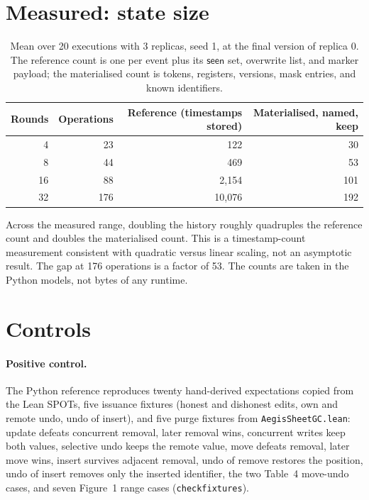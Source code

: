 \documentclass[11pt]{article}
\newcommand{\lean}[1]{\texttt{\def\_{\textunderscore\allowbreak}#1}}
\newcommand{\seen}{\mathsf{seen}}
\begin{document}
\section{Measured: state size}

\begin{table}[h]
\centering\small
\begin{tabular}{@{}rrrr@{}}
\toprule
Rounds & Operations & Reference (timestamps stored) & Materialised, named, keep \\
\midrule
4 & 23 & 122 & 30 \\
8 & 44 & 469 & 53 \\
16 & 88 & 2{,}154 & 101 \\
32 & 176 & 10{,}076 & 192 \\
\bottomrule
\end{tabular}
\caption{Mean over 20 executions with 3 replicas, seed 1, at the final
version of replica 0. The reference count is one per event plus its
$\seen$ set, overwrite list, and marker payload; the materialised count is
tokens, registers, versions, mask entries, and known identifiers.}
\label{tab:growth}
\end{table}

Across the measured range, doubling the history roughly quadruples the
reference count and doubles the materialised count. This is a
timestamp-count measurement consistent with quadratic versus linear scaling,
not an asymptotic result. The gap at 176 operations is a factor of 53. The
counts are taken in the Python models, not bytes of any runtime.

\section{Controls}
\label{sec:controls}

\paragraph{Positive control.} The Python reference reproduces twenty
hand-derived expectations copied from the Lean SPOTs, five issuance
fixtures (honest and dishonest edits, own and remote undo, undo of insert),
and five purge fixtures from \lean{AegisSheetGC.lean}: update defeats
concurrent removal, later removal wins, concurrent writes keep both values,
selective undo keeps the remote value, move defeats removal, later move wins,
insert survives adjacent removal, undo of remove restores the position, undo
of insert removes only the inserted identifier, the two Table~4 move-undo
cases, and seven Figure~1 range cases (\lean{check\_fixtures}).
\end{document}
